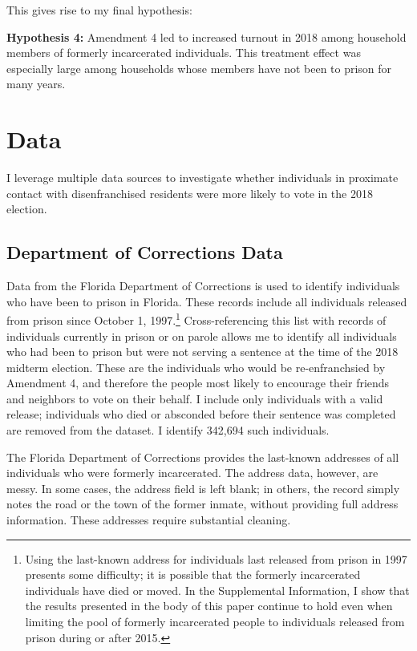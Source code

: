 \documentclass[
  12pt,
]{article}
\begin{document}
This gives rise to my final hypothesis:

\textbf{Hypothesis 4:} Amendment 4 led to increased turnout in 2018 among household members of formerly incarcerated individuals. This treatment effect was especially large among households whose members have not been to prison for many years.

\hypertarget{data}{%
\section*{Data}\label{data}}

I leverage multiple data sources to investigate whether individuals in proximate contact with disenfranchised residents were more likely to vote in the 2018 election.

\hypertarget{department-of-corrections-data}{%
\subsection*{Department of Corrections Data}\label{department-of-corrections-data}}

Data from the Florida Department of Corrections is used to identify individuals who have been to prison in Florida. These records include all individuals released from prison since October 1, 1997.\footnote{Using the last-known address for individuals last released from prison in 1997 presents some difficulty; it is possible that the formerly incarcerated individuals have died or moved. In the Supplemental Information, I show that the results presented in the body of this paper continue to hold even when limiting the pool of formerly incarcerated people to individuals released from prison during or after 2015.} Cross-referencing this list with records of individuals currently in prison or on parole allows me to identify all individuals who had been to prison but were not serving a sentence at the time of the 2018 midterm election. These are the individuals who would be re-enfranchsied by Amendment 4, and therefore the people most likely to encourage their friends and neighbors to vote on their behalf. I include only individuals with a valid release; individuals who died or absconded before their sentence was completed are removed from the dataset. I identify 342,694 such individuals.

The Florida Department of Corrections provides the last-known addresses of all individuals who were formerly incarcerated. The address data, however, are messy. In some cases, the address field is left blank; in others, the record simply notes the road or the town of the former inmate, without providing full address information. These addresses require substantial cleaning.
\end{document}
